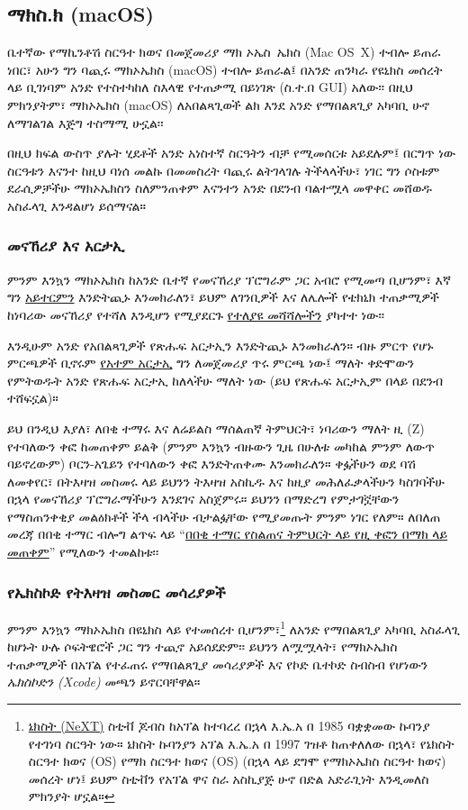 \subsection{ማክስ.ክ (macOS)} %
\label{sec:macos}

ቤተኛው የማኪንቶሽ ስርዓተ ክወና በመጀመሪያ ማክ ኦኤስ~ኤክስ (Mac OS~X) ተብሎ ይጠራ ነበር፣ አሁን ግን ባጪሩ ማክኦኤክስ (macOS) ተብሎ ይጠራል፤ በአንድ ጠንካራ የዩኒክስ መሰረት ላይ ቢገነባም አንድ የተስተካከለ ስእላዊ የተጠቃሚ በይነገጽ (ስ.ተ.በ GUI) አለው፡፡ በዚህ ምክንያትም፣ ማክኦኤክስ (macOS) ለአበልጻጊወች ልክ እንደ አንድ የማበልጸጊያ አካባቢ ሁኖ ለማገልገል እጅግ ተስማሚ ሁኗል፡፡

በዚህ ክፍል ውስጥ ያሉት ሂደቶች አንድ አነስተኛ ስርዓትን ብቻ የሚመሰርቱ አይደሉም፤ በርግጥ ነው ስርዓቱን እናንተ ከዚህ ባነሰ መልኩ በመመስረት ባጪሩ ልትገላገሉ ትችላላችሁ፣ ነገር ግን ሶስቱም ደራሲዎቻችሁ ማክኦኤክስን ስለምንጠቀም እናንተን አንድ በደንብ ባልተሟላ መዋቀር መሸወዱ አስፈላጊ እንዳልሆነ ይሰማናል።

\subsubsection{መናኸሪያ እና አርታኢ} %
\label{sec:terminal_and_editor}

ምንም እንኳን ማክኦኤክስ ከአንድ ቤተኛ የመናኸሪያ ፕሮግራም ጋር አብሮ የሚመጣ ቢሆንም፣ እኛ ግን \href{https://www.iterm2.com/downloads.html}{አይተርምን} እንድትጪኑ እንመክራለን፣ ይህም ለገንቢዎች እና ለሌሎች የቴክኒክ ተጠቃሚዎች ከነባሪው መናኸሪያ የተሻለ እንዲሆን የሚያደርጉ \href{https://www.iterm2.com/features.html}{የተለያዩ መሻሻሎችን} ያካተተ ነው፡፡

እንዲሁም አንድ የአበልጻጊዎች የጽሑፍ አርታኢን እንድትጪኑ እንመክራለን። ብዙ ምርጥ የሆኑ ምርጫዎች ቢኖሩም \href{https://atom.io/}{የአተም አርታኢ} ግን ለመጀመሪያ ጥሩ ምርጫ ነው፤ ማለት ቀድሞውን የምትወዱት አንድ የጽሑፍ አርታኢ ከለላችሁ ማለት ነው (ይህ የጽሑፍ አርታኢም በ ላይ በደንብ ተሸፍኗል)።

ይህ በንዲህ እያለ፣ ለበቂ ተማሩ እና ለሬይልስ ማሰልጠኛ ትምህርት፣ ነባሪውን ማለት ዚ (Z) የተባለውን ቀፎ ከመጠቀም ይልቅ (ምንም እንኳን ብዙውን ጊዜ በሁለቱ መካከል ምንም ለውጥ ባይኖረውም) ቦርን-አጌይን የተባለውን ቀፎ እንድትጠቀሙ እንመክራለን። ቀፏችሁን ወደ ባሽ ለመቀየር፣ በትእዛዝ መስመሩ ላይ ይህንን  ትእዛዝ አስኪዱ እና ከዚያ መሕለፈቃላችሁን ካስገባችሁ በኋላ የመናኸሪያ ፕሮግራማችሁን እንደገና አስጀምሩ። ይህንን በማድረግ የምታገኟቸውን የማስጠንቀቂያ መልዕክቶች ችላ ብላችሁ ብታልፏቸው የሚያመጡት ምንም ነገር የለም። ለበለጠ መረጃ በበቂ ተማር ብሎግ ልጥፍ ላይ ``\href{https://news.learnenough.com/macos-bash-zshell}{በበቂ ተማር የስልጠና ትምህርት ላይ የዚ ቀፎን በማክ ላይ መጠቀም}'' የሚለውን ተመልከቱ፡፡



\subsubsection{የኤክስኮድ የትእዛዝ መስመር መሳሪያዎች}
\label{sec:shiny_xcode}

ምንም እንኳን ማክኦኤክስ በዩኒክስ ላይ የተመሰረተ ቢሆንም፣\footnote{\href{https://en.wikipedia.org/wiki/NeXT}{ኔክስት (NeXT)} ስቲቭ ጆብስ ከአፕል ከተባረረ በኋላ እ.ኤ.አ በ 1985 ባቋቋመው ኩባንያ የተገነባ ስርዓት ነው። ኔክስት ኩባንያን አፕል እ.ኤ.አ በ 1997 ገዝቶ ከጠቀለለው በኋላ፣ የኔክስት ስርዓተ ክወና (OS) የማክ ስርዓተ ክወና (OS) (በኋላ ላይ ደግሞ የማክኦኤክስ ስርዓተ ክወና) መሰረት ሆነ፤ ይህም ስቲቭን የአፕል ዋና ስራ አስኪያጅ ሁኖ በድል አድራጊነት እንዲመለስ ምክንያት ሆኗል።} ለአንድ የማበልጸጊያ አካባቢ አስፈላጊ ከሆኑት ሁሉ ሶፍትዌሮች ጋር ግን ተጪኖ አይሰደድም፡፡ ይህንን ለሟሟላት፣ የማክኦኤክስ ተጠቃሚዎች በአፕል የተፈጠሩ የማበልጸጊያ መሳሪያዎች እና የኮድ ቤተኮድ ስብስብ የሆነውን \emph{ኤክስኮድን (Xcode)} መጫን ይኖርባቸዋል።

